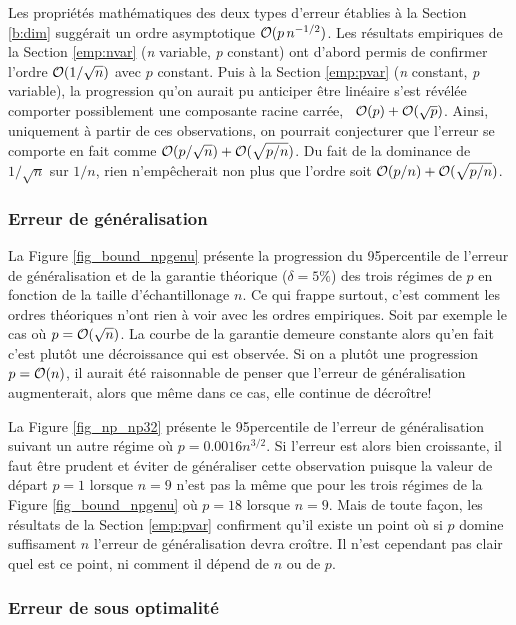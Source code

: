 Les propriétés mathématiques des deux types d'erreur établies à la Section \ref{b:dim}
suggérait un ordre asymptotique $\mathcal O(p\,n^{-1/2})$. Les résultats empiriques de la Section
\ref{emp:nvar} (\textit{n} variable, \textit{p} constant) ont d'abord permis de confirmer
l'ordre $\mathcal O(1/\sqrt{n})$ avec $p$ constant. Puis à la Section \ref{emp:pvar}
(\textit{n} constant, \textit{p} variable), la progression qu'on aurait pu anticiper être
linéaire s'est révélée comporter possiblement une composante racine carrée, \ie\
$\mathcal O(p) + \mathcal O(\sqrt{p})$. Ainsi, uniquement à partir de ces observations, on pourrait
conjecturer que l'erreur se comporte en fait comme
$\mathcal O(p/\sqrt{n}) + \mathcal O(\sqrt{p/n})$. Du fait de la dominance de $1/\sqrt{n}$ sur
$1/n$, rien n'empêcherait non plus que l'ordre soit $\mathcal O(p/n) + \mathcal O(\sqrt{p/n})$.


\subsubsection{Erreur de généralisation}


La Figure \ref{fig_bound_npgenu} présente la progression du 95\ieme percentile de l'erreur
de généralisation et de la garantie théorique ($\delta = 5\%$) des trois régimes de $p$ en
fonction de la taille d'échantillonage $n$. Ce qui frappe surtout, c'est comment les
ordres théoriques n'ont rien à voir avec les ordres empiriques. Soit par exemple le cas où
$p=\mathcal O(\sqrt{n})$. La courbe de la garantie demeure constante alors qu'en fait c'est
plutôt une décroissance qui est observée. Si on a plutôt une progression $p=\mathcal O(n)$, il
aurait été raisonnable de penser que l'erreur de généralisation augmenterait, alors que
même dans ce cas, elle continue de décroître!

La Figure \ref{fig_np_np32} présente le 95\ieme percentile de l'erreur de généralisation
suivant un autre régime où $p=0.0016n^{3/2}$. Si l'erreur est alors bien croissante, il
faut être prudent et éviter de généraliser cette observation puisque la valeur de départ
$p = 1$ lorsque $n=9$ n'est pas la même que pour les trois régimes de la Figure
\ref{fig_bound_npgenu} où $p=18$ lorsque $n=9$. Mais de toute façon, les résultats de la
Section \ref{emp:pvar} confirment qu'il existe un point où si $p$ domine suffisament $n$
l'erreur de généralisation devra croître. Il n'est cependant pas clair quel est ce point,
ni comment il dépend de $n$ ou de $p$.


\subsubsection{Erreur de sous optimalité}

